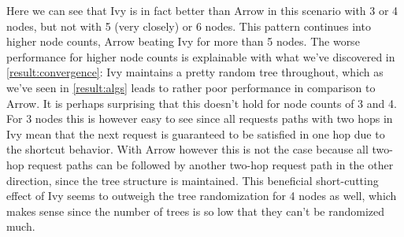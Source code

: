 \documentclass[a4paper, oneside]{discothesis}
\begin{document}

Here we can see that Ivy is in fact better than Arrow in this scenario with 3 or 4 nodes, but not with 5 (very closely) or 6 nodes. This pattern continues into higher node counts, Arrow beating Ivy for more than 5 nodes. The worse performance for higher node counts is explainable with what we've discovered in \autoref{result:convergence}: Ivy maintains a pretty random tree throughout, which as we've seen in \autoref{result:algs} leads to rather poor performance in comparison to Arrow. It is perhaps surprising that this doesn't hold for node counts of 3 and 4. For 3 nodes this is however easy to see since all requests paths with two hops in Ivy mean that the next request is guaranteed to be satisfied in one hop due to the shortcut behavior. With Arrow however this is not the case because all two-hop request paths can be followed by another two-hop request path in the other direction, since the tree structure is maintained. This beneficial short-cutting effect of Ivy seems to outweigh the tree randomization for 4 nodes as well, which makes sense since the number of trees is so low that they can't be randomized much.
\end{document}
